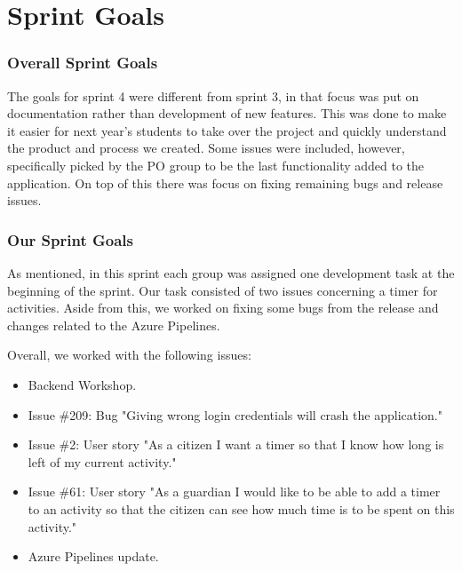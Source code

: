 \section{Sprint Goals}
\label{sect:sprintGoals4}
\subsubsection{Overall Sprint Goals}
The goals for sprint 4 were different from sprint 3, in that focus was put on documentation rather than development of new features. This was done to make it easier for next year's students to take over the project and quickly understand the product and process we created.
Some issues were included, however, specifically picked by the PO group to be the last functionality added to the application. On top of this there was focus on fixing remaining bugs and release issues. 

\subsubsection{Our Sprint Goals}
As mentioned, in this sprint each group was assigned one development task at the beginning of the sprint. Our task consisted of two issues concerning a timer for activities. Aside from this, we worked on fixing some bugs from the release and changes related to the Azure Pipelines.

Overall, we worked with the following issues:
\begin{itemize}
    \item Backend Workshop.
    \item Issue \#209: Bug "Giving wrong login credentials will crash the application."
    \item Issue \#2: User story "As a citizen I want a timer so that I know how long is left of my current activity."
    \item Issue \#61: User story "As a guardian I would like to be able to add a timer to an activity so that the citizen can see how much time is to be spent on this activity."
    \item Azure Pipelines update.
\end{itemize}